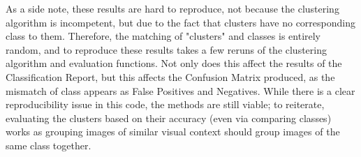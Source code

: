 \documentclass[10pt,twocolumn]{article}
\begin{document}
As a side note, these results are hard to reproduce, not because the clustering algorithm is incompetent, but due to the fact that clusters have no corresponding class to them. Therefore, the matching of "clusters" and classes is entirely random, and to reproduce these results takes a few reruns of the clustering algorithm and evaluation functions. Not only does this affect the results of the Classification Report, but this affects the Confusion Matrix produced, as the mismatch of class appears as False Positives and Negatives. While there is a clear reproducibility issue in this code, the methods are still viable; to reiterate, evaluating the clusters based on their accuracy (even via comparing classes) works as grouping images of similar visual context should group images of the same class together.





\printbibliography
 
\end{document}
